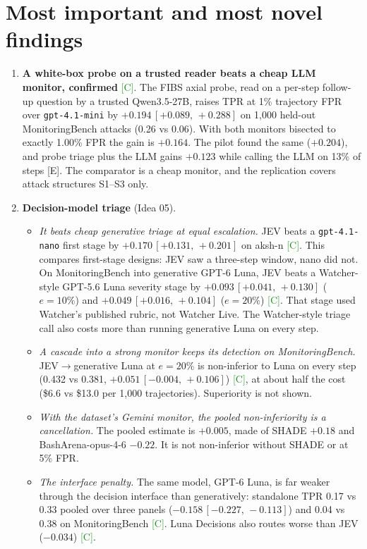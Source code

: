 \documentclass[11pt]{article}
\newcommand{\tC}{\textsf{\scriptsize\textcolor{ForestGreen}{[C]}}\xspace}
\newcommand{\tE}{\textsf{\scriptsize\textcolor{ink2}{[E]}}\xspace}
\newcommand{\ci}[2]{\,[#1,\,#2]}
\begin{document}
\section{Most important and most novel findings}\label{sec:findings}
\begin{enumerate}
\item \textbf{A white-box probe on a trusted reader beats a cheap LLM monitor, confirmed} \tC. The FIBS axial probe, read on a per-step follow-up question by a trusted Qwen3.5-27B, raises TPR at 1\% trajectory FPR over \texttt{gpt-4.1-mini} by $+0.194\ci{+0.089}{+0.288}$ on 1{,}000 held-out MonitoringBench attacks (0.26 vs 0.06). With both monitors bisected to exactly 1.00\% FPR the gain is $+0.164$. The pilot found the same ($+0.204$), and probe triage plus the LLM gains $+0.123$ while calling the LLM on 13\% of steps \tE. The comparator is a cheap monitor, and the replication covers attack structures S1--S3 only.
\item \textbf{Decision-model triage} (Idea 05).
  \begin{itemize}
  \item \emph{It beats cheap generative triage at equal escalation.} JEV beats a \texttt{gpt-4.1-nano} first stage by $+0.170\ci{+0.131}{+0.201}$ on aksh-n \tC. This compares first-stage designs: JEV saw a three-step window, nano did not. On MonitoringBench into generative GPT-6 Luna, JEV beats a Watcher-style GPT-5.6 Luna severity stage by $+0.093\ci{+0.041}{+0.130}$ ($e=10\%$) and $+0.049\ci{+0.016}{+0.104}$ ($e=20\%$) \tC. That stage used Watcher's published rubric, not Watcher Live. The Watcher-style triage call also costs more than running generative Luna on every step.
  \item \emph{A cascade into a strong monitor keeps its detection on MonitoringBench.} JEV$\to$generative Luna at $e=20\%$ is non-inferior to Luna on every step (0.432 vs 0.381, $+0.051\ci{-0.004}{+0.106}$) \tC, at about half the cost (\$6.6 vs \$13.0 per 1{,}000 trajectories). Superiority is not shown.
  \item \emph{With the dataset's Gemini monitor, the pooled non-inferiority is a cancellation.} The pooled estimate is $+0.005$, made of SHADE $+0.18$ and BashArena-opus-4-6 $-0.22$. It is not non-inferior without SHADE or at 5\% FPR.
  \item \emph{The interface penalty.} The same model, GPT-6 Luna, is far weaker through the decision interface than generatively: standalone TPR 0.17 vs 0.33 pooled over three panels ($-0.158\ci{-0.227}{-0.113}$) and 0.04 vs 0.38 on MonitoringBench \tC. Luna Decisions also routes worse than JEV ($-0.034$) \tC.

\end{itemize}
\end{enumerate}
\end{document}
